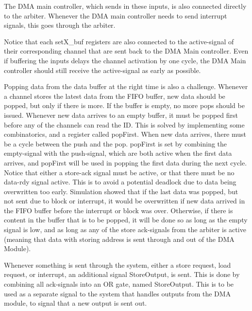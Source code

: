 \begin{appendix}
The DMA main controller, which sends in these inputs, is also connected directly to the arbiter.
Whenever the DMA main controller needs to send interrupt signals, this goes through the arbiter.

Notice that each setX\_buf registers are also connected to the active-signal of their corresponding channel that are sent back to the DMA Main controller.
Even if buffering the inputs delays the channel activation by one cycle, the DMA Main controller should still receive the active-signal as early as possible.

Popping data from the data buffer at the right time is also a challenge.
Whenever a channel stores the latest data from the FIFO buffer, new data should be popped, but only if there is more.
If the buffer is empty, no more pops should be issued.
Whenever new data arrives to an empty buffer, it must be popped first before any of the channels can read the ID.
This is solved by implementing some combinatorics, and a register called popFirst.
When new data arrives, there must be a cycle between the push and the pop.
popFirst is set by combining the empty-signal with the push-signal, which are both active when the first data arrives, and popFirst will be used in popping the first data during the next cycle.
Notice that either a store-ack signal must be active, or that there must be no data-rdy signal active.
This is to avoid a potential deadlock due to data being overwritten too early.
Simulation showed that if the last data was popped, but not sent due to block or interrupt, it would be overwritten if new data arrived in the FIFO buffer before the interrupt or block was over.
Otherwise, if there is content in the buffer that is to be popped, it will be done so as long as the empty signal is low, and as long as any of the store ack-signals from the arbiter is active (meaning that data with storing address is sent through and out of the DMA Module).

Whenever something is sent through the system, either a store request, load request, or interrupt, an additional signal StoreOutput, is sent.
This is done by combining all ack-signals into an OR gate, named StoreOutput.
This is to be used as a separate signal to the system that handles outputs from the DMA module, to signal that a new output is sent out.


\end{appendix}
